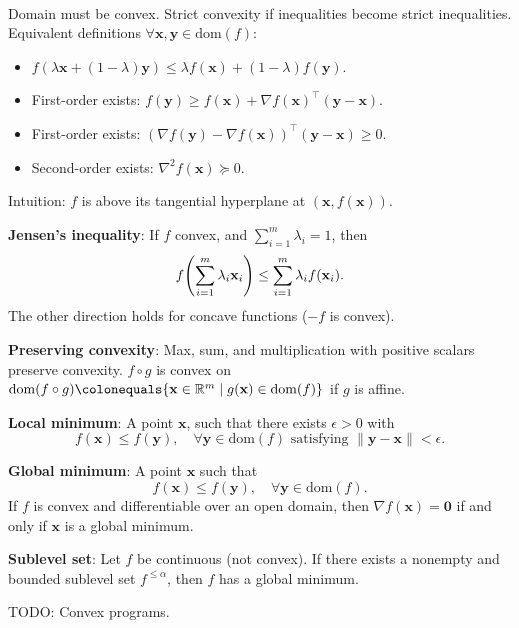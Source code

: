\documentclass{article}
\newcommand{\lft}{\mathopen{}\mathclose\bgroup\left}
\newcommand{\rgt}{\aftergroup\egroup\right}
\newcommand{\R}{\mathbb{R}}
\renewcommand{\vec}[1]{\mathbf{#1}}
\newcommand{\mat}[1]{#1}
\newcommand{\transpose}[1]{#1^\top}
\newcommand{\dom}[1]{\mathrm{dom}(#1)}
\newenvironment{topic}[1]
{\textbf{\sffamily \colorbox{black}{\rlap{\textbf{\textcolor{white}{#1}}}\hspace{\linewidth}\hspace{-2\fboxsep}}} \\ \vspace{0.2cm}}
{}
\begin{document}
\begin{multicols*}{2}
    \begin{topic}{2 Convexity}
        Domain must be convex. Strict convexity if inequalities become strict inequalities.
        Equivalent definitions $\forall \vec{x},\vec{y} \in \dom{f}$:
        \begin{itemize}
            \item $f(\lambda \vec{x} + (1-\lambda)\vec{y}) \leq \lambda f(\vec{x}) + (1-\lambda) f(\vec{y})$.
            \item First-order exists: $f(\vec{y}) \geq f(\vec{x}) + \transpose{\nabla f(\vec{x})} (\vec{y} -
                      \vec{x})$.
            \item First-order exists: $\transpose{(\nabla f(\vec{y}) - \nabla f(\vec{x}))} (\vec{y} - \vec{x}) \geq
                      0$.
            \item Second-order exists: $\nabla^2 f(\vec{x}) \succeq \mat{0}$.
        \end{itemize}
        Intuition: $f$ is above its tangential hyperplane at $(\vec{x}, f(\vec{x}))$.

        \textbf{Jensen's inequality}: If $f$ convex, and $\sum_{i=1}^m \lambda_i = 1$, then \[
            f \lft( \sum_{i=1}^{m} \lambda_i \vec{x}_i \rgt) \leq \sum_{i=1}^{m} \lambda_i f(\vec{x}_i).
        \]
        The other direction holds for concave functions ($-f$ is convex).

        \textbf{Preserving convexity}: Max, sum, and multiplication with positive scalars preserve
        convexity. $f \circ g$ is convex on $\dom{f \circ g} \colonequals \{ \vec{x} \in \R^m \mid
            g(\vec{x}) \in \dom{f} \}$ if $g$ is affine.

        \textbf{Local minimum}: A point $\vec{x}$, such that there exists $\epsilon > 0$ with \[
            f(\vec{x}) \leq f(\vec{y}), \quad \forall \vec{y} \in \dom{f} \text{ satisfying } \| \vec{y} - \vec{x} \| < \epsilon.
        \]

        \textbf{Global minimum}: A point $\vec{x}$ such that \[
            f(\vec{x}) \leq f(\vec{y}), \quad \forall \vec{y} \in \dom{f}.
        \]
        If $f$ is convex and differentiable over an open domain, then $\nabla f(\vec{x}) = \vec{0}$ if and
        only if $\vec{x}$ is a global minimum.

        \textbf{Sublevel set}: Let $f$ be continuous (not convex). If there exists a nonempty and
        bounded sublevel set $f^{\leq \alpha}$, then $f$ has a global minimum.

        TODO: Convex programs.
    \end{topic}


\end{multicols*}
\end{document}
